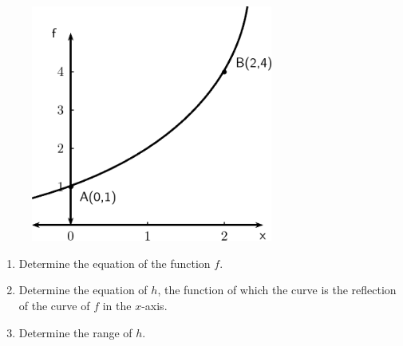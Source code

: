 \begin{enumerate}[noitemsep, label=\textbf{\arabic*}. ]
	\begin{figure}[H] %
    \begin{center}
    \label{m39348*id253318!!!underscore!!!media}\label{m39348*id253318!!!underscore!!!printimage}\includegraphics[width=300px]{col11306.imgs/m39348_MG10C11_033.png} %
        
      \vspace{2pt}
    \vspace{.1in}
    
    \end{center}

 \end{figure}   

    \addtocounter{footnote}{-0}
    \label{m39348*id253324}\begin{enumerate}[noitemsep, label=\textbf{\alph*}. ] 
            \label{m39348*uid203}\item Determine the equation of the function \begin{math}f\end{math}.
\label{m39348*uid204}\item Determine the equation of \begin{math}h\end{math}, the function of which the curve is the reflection of the curve of \begin{math}f\end{math} in the \begin{math}x\end{math}-axis.
\label{m39348*uid205}\item Determine the range of \begin{math}h\end{math}.
\end{enumerate}
                \end{enumerate}
        

